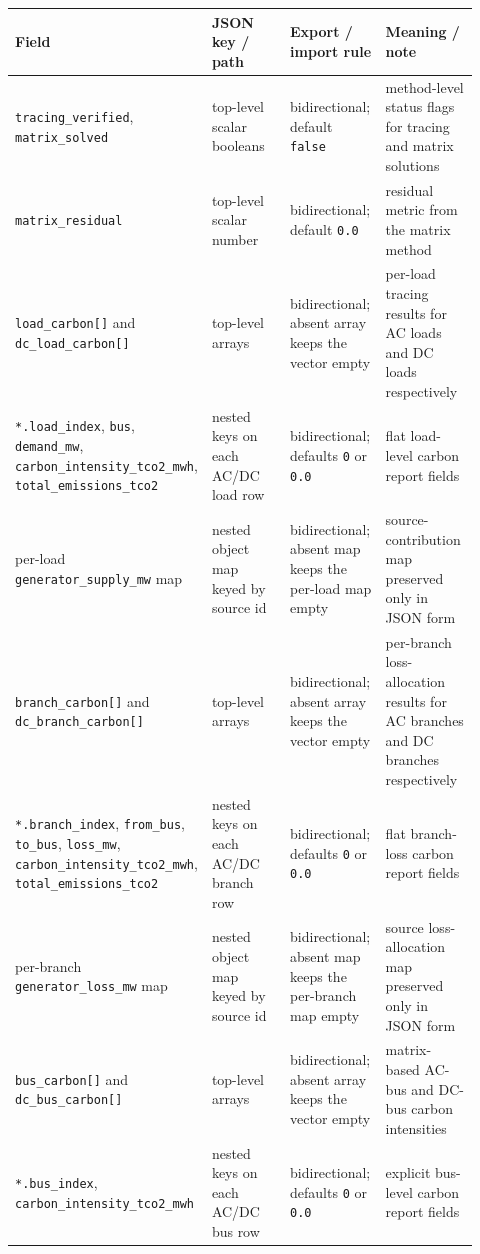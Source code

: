 \begin{longtable}{@{}L{0.17\linewidth}L{0.29\linewidth}L{0.22\linewidth}L{0.24\linewidth}@{}}
\toprule
Field & JSON key / path & Export / import rule & Meaning / note \\
\midrule
\endhead
\texttt{tracing\_verified}, \texttt{matrix\_solved} & top-level scalar booleans & bidirectional; default \texttt{false} & method-level status flags for tracing and matrix solutions \\
\texttt{matrix\_residual} & top-level scalar number & bidirectional; default \texttt{0.0} & residual metric from the matrix method \\
\texttt{load\_carbon[]} and \texttt{dc\_load\_carbon[]} & top-level arrays & bidirectional; absent array keeps the vector empty & per-load tracing results for AC loads and DC loads respectively \\
\texttt{*.load\_index}, \texttt{bus}, \texttt{demand\_mw}, \texttt{carbon\_intensity\_tco2\_mwh}, \texttt{total\_emissions\_tco2} & nested keys on each AC/DC load row & bidirectional; defaults \texttt{0} or \texttt{0.0} & flat load-level carbon report fields \\
per-load \texttt{generator\_supply\_mw} map & nested object map keyed by source id & bidirectional; absent map keeps the per-load map empty & source-contribution map preserved only in JSON form \\
\texttt{branch\_carbon[]} and \texttt{dc\_branch\_carbon[]} & top-level arrays & bidirectional; absent array keeps the vector empty & per-branch loss-allocation results for AC branches and DC branches respectively \\
\texttt{*.branch\_index}, \texttt{from\_bus}, \texttt{to\_bus}, \texttt{loss\_mw}, \texttt{carbon\_intensity\_tco2\_mwh}, \texttt{total\_emissions\_tco2} & nested keys on each AC/DC branch row & bidirectional; defaults \texttt{0} or \texttt{0.0} & flat branch-loss carbon report fields \\
per-branch \texttt{generator\_loss\_mw} map & nested object map keyed by source id & bidirectional; absent map keeps the per-branch map empty & source loss-allocation map preserved only in JSON form \\
\texttt{bus\_carbon[]} and \texttt{dc\_bus\_carbon[]} & top-level arrays & bidirectional; absent array keeps the vector empty & matrix-based AC-bus and DC-bus carbon intensities \\
\texttt{*.bus\_index}, \texttt{carbon\_intensity\_tco2\_mwh} & nested keys on each AC/DC bus row & bidirectional; defaults \texttt{0} or \texttt{0.0} & explicit bus-level carbon report fields \\

\end{longtable}
